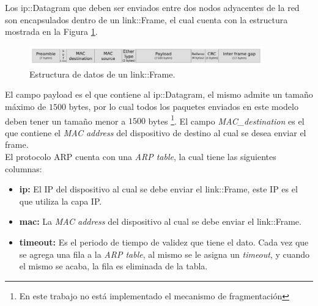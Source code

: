 \documentclass[10pt,a4paper]{article}
\begin{document}
Los ip::Datagram que deben ser enviados entre dos nodos adyacentes de la red son encapsulados dentro de un link::Frame, el cual cuenta con la estructura mostrada en la Figura \ref{figure: frame structure}. \\

\begin{figure}[!htb]
    \centering
    \includegraphics[width = 0.9\textwidth]{img/png/l2-frame.png}
    \caption{Estructura de datos de un link::Frame.}
    \label{figure: frame structure}
\end{figure}

El campo payload es el que contiene al ip::Datagram, el mismo admite un tamaño máximo de $1500$ bytes, por lo cual todos los paquetes enviados en este modelo deben tener un tamaño menor a $1500$ bytes \footnote{En este trabajo no está implementado el mecanismo de fragmentación}. El campo \textit{MAC\_destination} es el que contiene el \textit{MAC address} del dispositivo de destino al cual se desea enviar el frame.\\

El protocolo ARP cuenta con una \textit{ARP table}, la cual tiene las siguientes columnas:

\begin{itemize}
\item \textbf{ip:} El IP del dispositivo al cual se debe enviar el link::Frame, este IP es el que utiliza la capa IP.
\item \textbf{mac:} La \textit{MAC address} del dispositivo al cual se debe enviar el link::Frame.
\item \textbf{timeout:} Es el periodo de tiempo de validez que tiene el dato. Cada vez que se agrega una fila a la \textit{ARP table}, al mismo se le asigna un \textit{timeout}, y cuando el mismo se acaba, la fila es eliminada de la tabla.
\end{itemize}
\end{document}
